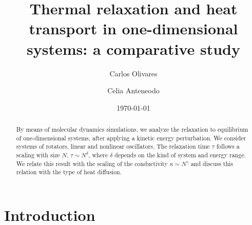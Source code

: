 \documentclass[aps,pre,showpacs,twocolumn,superscriptaddress,floatfix]{revtex4-1}
\begin{document}
\title{Thermal relaxation and heat transport in one-dimensional systems: a comparative study}
 
\author{Carlos Olivares}

\author{Celia Anteneodo}


\date{\today}

\begin{abstract} 
By means of molecular dynamics simulations, we analyze the relaxation to equilibrium 
of one-dimensional systems, after applying a kinetic energy perturbation. 
We consider systems of rotators, linear and nonlinear oscillators. 
The relaxation time $\tau$ follows a scaling with size $N$, $\tau \sim N^\delta$, where $\delta$ 
depends on the kind of system and energy range. 
We relate this result with the scaling of the conductivity $\kappa \sim N^\gamma$ and discuss 
this relation with the type of heat diffusion. 
\end{abstract}

\maketitle

 

\section{Introduction}
\end{document}
